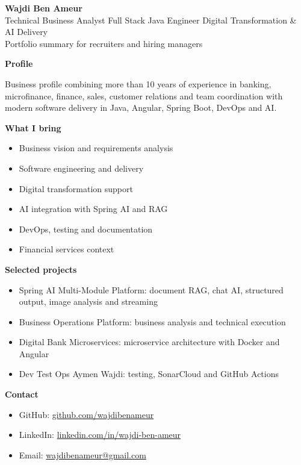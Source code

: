 \documentclass[11pt]{article}
\begin{document}
\begin{center}
{\LARGE \textbf{Wajdi Ben Ameur}}\\[0.25em]
{\large \textcolor{accent}{Technical Business Analyst \textbar{} Full Stack Java Engineer \textbar{} Digital Transformation \& AI Delivery}}\\[0.5em]
\textcolor{muted}{Portfolio summary for recruiters and hiring managers}
\end{center}

\vspace{0.5em}
\textbf{Profile}

Business profile combining more than 10 years of experience in banking, microfinance, finance, sales, customer relations and team coordination with modern software delivery in Java, Angular, Spring Boot, DevOps and AI.

\vspace{0.8em}
\textbf{What I bring}
\begin{itemize}
  \item Business vision and requirements analysis
  \item Software engineering and delivery
  \item Digital transformation support
  \item AI integration with Spring AI and RAG
  \item DevOps, testing and documentation
  \item Financial services context
\end{itemize}

\vspace{0.8em}
\textbf{Selected projects}
\begin{itemize}
  \item Spring AI Multi-Module Platform: document RAG, chat AI, structured output, image analysis and streaming
  \item Business Operations Platform: business analysis and technical execution
  \item Digital Bank Microservices: microservice architecture with Docker and Angular
  \item Dev Test Ops Aymen Wajdi: testing, SonarCloud and GitHub Actions
\end{itemize}

\vspace{0.8em}
\textbf{Contact}
\begin{itemize}
  \item GitHub: \href{https://github.com/wajdibenameur}{github.com/wajdibenameur}
  \item LinkedIn: \href{https://www.linkedin.com/in/wajdi-ben-ameur/}{linkedin.com/in/wajdi-ben-ameur}
  \item Email: \href{mailto:wajdibenameur@gmail.com}{wajdibenameur@gmail.com}
\end{itemize}
\end{document}
